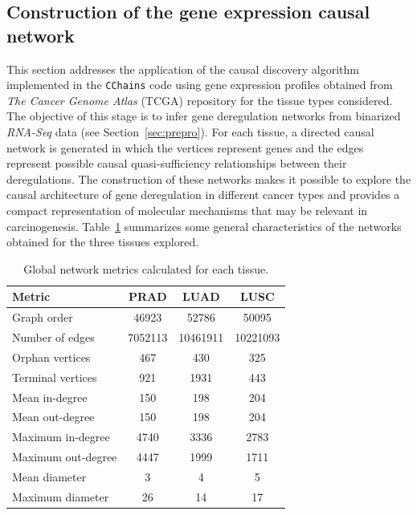 \documentclass[12pt,a4paper]{report}
\begin{document}
\subsection{Construction of the gene expression causal network}
This section addresses the application of the causal discovery algorithm implemented in the \texttt{CChains} code using gene expression profiles obtained from \textit{The Cancer Genome Atlas} (TCGA) repository for the tissue types considered. The objective of this stage is to infer gene deregulation networks from binarized \textit{RNA-Seq} data (see Section~\ref{sec:prepro}). For each tissue, a directed causal network is generated in which the vertices represent genes and the edges represent possible causal quasi-sufficiency relationships between their deregulations. The construction of these networks makes it possible to explore the causal architecture of gene deregulation in different cancer types and provides a compact representation of molecular mechanisms that may be relevant in carcinogenesis.
Table~\ref{tab:metrics} summarizes some general characteristics of the networks obtained for the three tissues explored.

\begin{table}[H]
\centering
\caption{Global network metrics calculated for each tissue.}
\label{tab:metrics}
\begin{tabular}{lccc}
\hline
\textbf{Metric}         & \textbf{PRAD}   & \textbf{LUAD}   & \textbf{LUSC}   \\
\hline
Graph order          & 46923           & 52786           & 50095           \\
Number of edges        & 7052113        & 10461911        & 10221093        \\
Orphan vertices& 467             & 430             & 325             \\
Terminal vertices& 921           & 1931            & 443             \\
Mean in-degree& 150             & 198             & 204             \\
Mean out-degree& 150             & 198             & 204             \\
Maximum in-degree     & 4740            & 3336            & 2783            \\
Maximum out-degree      & 4447           & 1999            & 1711            \\
Mean diameter        & 3               & 4               & 5            \\
Maximum diameter          & 26               & 14              & 17              \\
\hline
\end{tabular}
\end{table}
\end{document}
